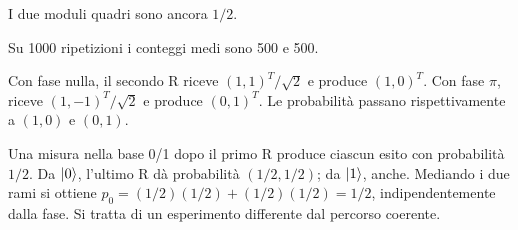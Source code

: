 


I due moduli quadri sono ancora \(1/2\).




Su 1000 ripetizioni i conteggi medi sono 500 e 500.


Con fase nulla, il secondo R riceve \((1,1)^T/\sqrt2\) e produce \((1,0)^T\). Con fase \(\pi\), riceve \((1,-1)^T/\sqrt2\) e produce \((0,1)^T\). Le probabilità passano rispettivamente a \((1,0)\) e \((0,1)\).


Una misura nella base 0/1 dopo il primo R produce ciascun esito con probabilità \(1/2\). Da \(\lvert 0\rangle\), l’ultimo R dà probabilità \((1/2,1/2)\); da \(\lvert 1\rangle\), anche. Mediando i due rami si ottiene \(p_0=(1/2)(1/2)+(1/2)(1/2)=1/2\), indipendentemente dalla fase. Si tratta di un esperimento differente dal percorso coerente.

